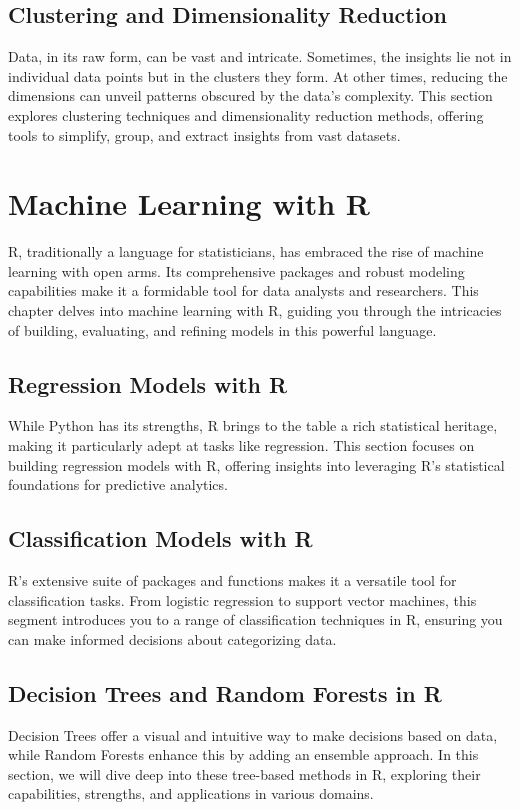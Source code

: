 \documentclass{book}
\begin{document}
\section{Clustering and Dimensionality Reduction}
Data, in its raw form, can be vast and intricate. Sometimes, the insights lie not in individual data points but in the clusters they form. At other times, reducing the dimensions can unveil patterns obscured by the data's complexity. This section explores clustering techniques and dimensionality reduction methods, offering tools to simplify, group, and extract insights from vast datasets.

\chapter{Machine Learning with R}
R, traditionally a language for statisticians, has embraced the rise of machine learning with open arms. Its comprehensive packages and robust modeling capabilities make it a formidable tool for data analysts and researchers. This chapter delves into machine learning with R, guiding you through the intricacies of building, evaluating, and refining models in this powerful language.

\section{Regression Models with R}
While Python has its strengths, R brings to the table a rich statistical heritage, making it particularly adept at tasks like regression. This section focuses on building regression models with R, offering insights into leveraging R's statistical foundations for predictive analytics.

\section{Classification Models with R}
R's extensive suite of packages and functions makes it a versatile tool for classification tasks. From logistic regression to support vector machines, this segment introduces you to a range of classification techniques in R, ensuring you can make informed decisions about categorizing data.

\section{Decision Trees and Random Forests in R}
Decision Trees offer a visual and intuitive way to make decisions based on data, while Random Forests enhance this by adding an ensemble approach. In this section, we will dive deep into these tree-based methods in R, exploring their capabilities, strengths, and applications in various domains.
\end{document}
